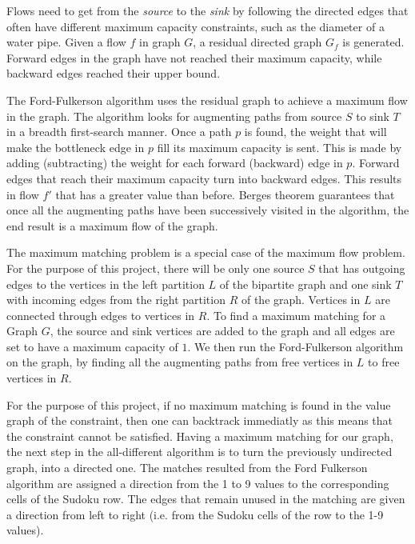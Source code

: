 \documentclass{l4proj}
\begin{document}
\noindent Flows need to get from the \textit{source} to the \textit{sink} by following the directed edges that often have different maximum capacity constraints, such as the diameter of a water pipe. Given a flow $f$ in graph $G$, a residual directed graph $G_f$ is generated. Forward edges in the graph have not reached their maximum capacity, while backward edges reached their upper bound. 

\noindent The Ford-Fulkerson algorithm  \cite{ford1956maximal} uses the residual graph to achieve a maximum flow in the graph. The algorithm looks for augmenting paths from source $S$ to sink $T$ in a breadth first-search manner. Once a path $p$ is found, the weight that will make the bottleneck edge in $p$ fill its maximum capacity is sent. This is made by adding (subtracting) the weight for each forward (backward) edge in $p$. Forward edges that reach their maximum capacity turn into backward edges. This results in flow $f'$ that has a greater value than before. Berge\textquotesingle s theorem \cite{berge1957two} guarantees that once all the augmenting paths have been successively visited in the algorithm, the end result is a maximum flow of the graph.

\noindent The maximum matching problem is a special case of the maximum flow problem. For the purpose of this project, there will be only one source $S$ that has outgoing edges to the vertices in the left partition $L$ of the bipartite graph and one sink $T$ with incoming edges from the right partition $R$ of the graph. Vertices in $L$ are connected through edges to vertices in $R$. To find a maximum matching for a Graph $G$, the source and sink vertices are added to the graph and all edges are set to have a maximum capacity of $1$. We then run the Ford-Fulkerson algorithm \cite{ford1956maximal} on the graph, by finding all the augmenting paths from free vertices in $L$ to free vertices in $R$.

\noindent For the purpose of this project, if no maximum matching is found in the value graph of the constraint, then one can backtrack immediatly as this means that the constraint cannot be satisfied. Having a maximum matching for our graph, the next step in the all-different algorithm is to turn the previously undirected graph, into a directed one. The matches resulted from the Ford Fulkerson algorithm \cite{ford1956maximal} are assigned a direction from the 1 to 9 values to the corresponding cells of the Sudoku row. The edges that remain unused in the matching are given a direction from left to right (i.e. from the Sudoku cells of the row to the 1-9 values).
\end{document}
